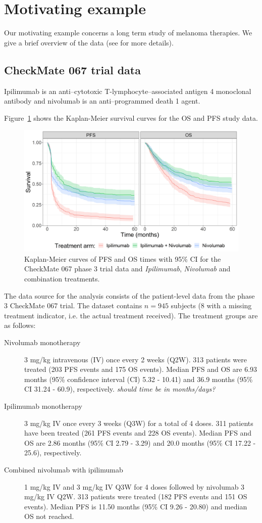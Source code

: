 \documentclass[AMA,STIX1COL]{WileyNJD-v2}
\begin{document}
\section{Motivating example}\label{sec:example}
Our motivating example concerns a long term study of melanoma therapies.
We give a brief overview of the data (see \cite{Larkin2019} for more details).

\subsection{CheckMate 067 trial data}
Ipilimumab is an anti–cytotoxic T-lymphocyte–associated antigen 4 monoclonal antibody and 
nivolumab is an anti–programmed death 1 agent.

Figure~\ref{fig:S_raw_data} shows the Kaplan-Meier survival curves for the OS and PFS study data.

\begin{figure}[!HtH]
\centering
\includegraphics[width=0.6\linewidth]{km_raw_data.png}
\caption{\label{fig:S_raw_data} Kaplan-Meier curves of PFS and OS times with 95\% CI for the CheckMate 067 phase 3 trial data and {\it Ipilimumab}, {\it Nivolumab} and combination treatments.}
\end{figure}

The data source for the analysis consists of the patient-level data from the phase 3 CheckMate 067 trial\citep{Wolchok2017, Larkin2019}.
The dataset contains $n = 945$ subjects (8 with a missing treatment indicator, i.e. the actual treatment received).
The treatment groups are as follows:
\begin{description}
\item[Nivolumab monotherapy] 3 mg/kg intravenous (IV) once every 2 weeks (Q2W). 313 patients were treated (203 PFS events and 175 OS events).
Median PFS and OS are 6.93 months (95\% confidence interval (CI) 5.32 - 10.41) and 36.9 months (95\% CI 31.24 - 60.9), respectively. {\it should time be in months/days?}
\item[Ipilimumab monotherapy] 3 mg/kg IV once every 3 weeks (Q3W) for a total of 4 doses.
311 patients have been treated (261 PFS events and 228 OS events). Median PFS and OS are 2.86 months (95\% CI 2.79 - 3.29) and 20.0 months (95\% CI 17.22 - 25.6), respectively.
\item[Combined nivolumab with ipilimumab] 1 mg/kg IV and 3 mg/kg IV Q3W for 4 doses followed by nivolumab 3 mg/kg IV Q2W.
313 patients were treated (182 PFS events and 151 OS events). Median PFS is 11.50 months (95\% CI 9.26 - 20.80) and median OS not reached. 
\end{description}
\end{document}
